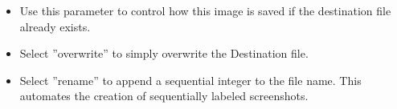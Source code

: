 
\begin{itemize}
\item Use this parameter to control how this image is saved if the destination file already exists.
\item Select ''overwrite'' to simply overwrite the Destination file.
\item Select ''rename'' to append a sequential integer to the file name. This automates the creation of sequentially labeled screenshots.
\end{itemize}
